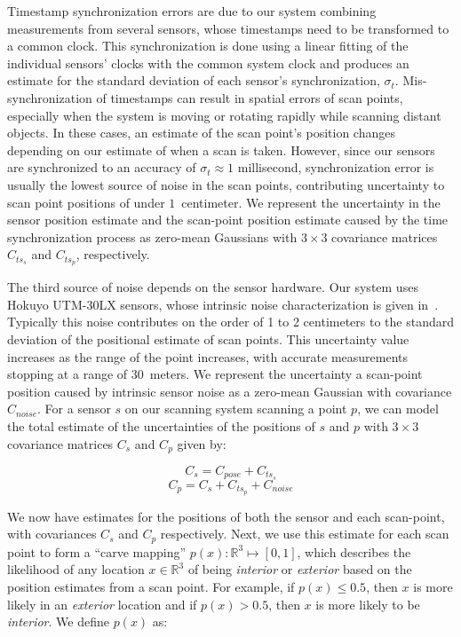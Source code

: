 \documentclass[review]{acmsiggraph}
\begin{document}
Timestamp synchronization errors are due to our system combining measurements from several sensors, whose timestamps need to be transformed to a common clock.  This synchronization is done using a linear fitting of the individual sensors' clocks with the common system clock and produces an estimate for the standard deviation of each sensor's synchronization, $\sigma_t$.  Mis-synchronization of timestamps can result in spatial errors of scan points, especially when the system is moving or rotating rapidly while scanning distant objects.  In these cases, an estimate of the scan point's position changes depending on our estimate of when a scan is taken.  However, since our sensors are synchronized to an accuracy of $\sigma_t \approx 1$ millisecond, synchronization error is usually the lowest source of noise in the scan points, contributing uncertainty to scan point positions of under $1$~centimeter.  We represent the uncertainty in the sensor position estimate and the scan-point position estimate caused by the time synchronization process as zero-mean Gaussians with $3 \times 3$ covariance matrices $C_{ts_s}$ and $C_{ts_p}$, respectively.

The third source of noise depends on the sensor hardware.  Our system uses Hokuyo UTM-30LX sensors, whose intrinsic noise characterization is given in~\cite{Pomerleau12}.  Typically this noise contributes on the order of 1 to 2 centimeters to the standard deviation of the positional estimate of scan points.  This uncertainty value increases as the range of the point increases, with accurate measurements stopping at a range of $30$~meters.  We represent the uncertainty a scan-point position caused by intrinsic sensor noise as a zero-mean Gaussian with covariance $C_{noise}$.  For a sensor $s$ on our scanning system scanning a point $p$, we can model the total estimate of the uncertainties of the positions of $s$ and $p$ with $3 \times 3$ covariance matrices $C_s$ and $C_p$ given by:

\begin{equation}
	C_s = C_{pose} + C_{ts_s}
\end{equation}
\begin{equation}
	C_p = C_s + C_{ts_p} + C_{noise}
\end{equation}

We now have estimates for the positions of both the sensor and each scan-point, with covariances $C_s$ and $C_p$ respectively.  Next, we use this estimate for each scan point to form a ``carve mapping'' $p(x) : \mathbb{R}^3 \mapsto [0,1]$, which describes the likelihood of any location $x \in \mathbb{R}^3$ of being {\it interior} or {\it exterior} based on the position estimates from a scan point.  For example, if $p(x) \leq 0.5$, then $x$ is more likely in an {\it exterior} location and if $p(x) > 0.5$, then $x$ is more likely to be {\it interior}.  We define $p(x)$ as:
\end{document}
